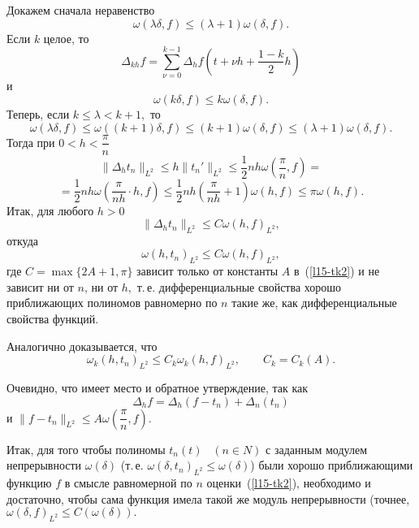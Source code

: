Докажем сначала неравенство
$$
\omega(\lambda\delta,f)\le (\lambda+1)\omega(\delta,f).
$$
Если $k$ целое, то
$$
\Delta_{kh}f={\sum\limits_{\nu=0}^{k-1} \Delta_h f\left(t+\nu h+\frac{1-k}{2}h\right)}
$$
и
$$
\omega(k\delta,f)\le k\omega(\delta,f).
$$
Теперь, если $k\le \lambda < k+1,$ то
$$
\omega(\lambda\delta,f)\le \omega((k+1)\delta,f)\le
(k+1)\omega(\delta,f)\le (\lambda+1)\omega(\delta,f).
$$
Тогда {при $0<h<\dfrac{\pi}{n}$}
$$
\|\Delta_h t_n\|_{{L^2}}\le h\|t_n'\|_{{L^2}}\le
\frac12 nh \omega\left( \frac{\pi}{n},f\right){=}
$$
$$
= \frac12 nh \omega\left( \frac{\pi}{nh}\cdot h,f\right)\le
\frac12 nh \left( \frac{\pi}{nh}+1\right)\omega(h,f)\le \pi\omega(h,f).
$$
Итак, для  любого {$h>0$}
$$
\|\Delta_h t_n\|_{{L^2}}\le C \omega(h,f)_{L^2},
$$
откуда
$$
\omega(h,t_n)_{L^2}\le C \omega(h,f)_{L^2},
$$
где $C=\max\{2A+1,\pi\}$ {зависит только от константы $A$ в~(\ref{l15-tk2})} и
не зависит ни от $n$, ни от $h,$ т.\,е. дифференциальные свойства хорошо
приближающих полиномов равномерно по $n$ такие же, как дифференциальные свойства функций.

Аналогично доказывается, что
$$
\omega_k(h,t_n)_{L^2}\le C_k \omega_k(h,f)_{L^2},\qquad {C_k=C_k(A).}
$$

Очевидно, что имеет место и обратное утверждение, так как
$$
\Delta_h f=\Delta_h(f-t_n)+\Delta_n(t_n)
$$
и {$\|f-t_n\|_{L^2} \le A \omega\left(\dfrac{\pi}{n},f\right).$}

Итак, для того чтобы {полиномы $t_n(t)$~ $(n\in N)$ с заданным модулем непрерывности}
$\omega(\delta)$ (т.\,е. $\omega(\delta,t_n)_{L^2}\le \omega(\delta)$)
{были хорошо приближающими функцию $f$ в смысле равномерной по
$n$ оценки~(\ref{l15-tk2}),} необходимо и достаточно, чтобы сама функция имела такой же модуль
непрерывности (точнее, $\omega(\delta,f)_{L^2}\le C(\omega(\delta)).$
